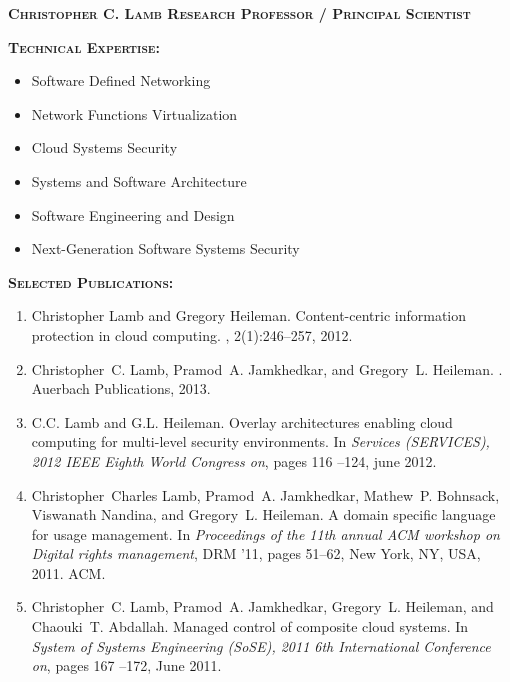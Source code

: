 \documentclass{sbir}
\begin{document}
{{\textbf{\textsc{Christopher C. Lamb \hfill Research Professor / Principal Scientist}}

\vspace{-18pt}
{\textcolor{black}{\makebox[6.5in]{\hrulefill}}
\textbf{\textsc{Technical Expertise:}}
\vspace{-8pt}
\begin{multicols}{2}
\begin{itemize}
 \item Software Defined Networking
 \item Network Functions Virtualization
 \item Cloud Systems Security
 \item Systems and Software Architecture
 \item Software Engineering and Design
 \item Next-Generation Software Systems Security	
\end{itemize}
\end{multicols}

\vspace{-16pt}
\textbf{\textsc{Selected Publications:}}
\begin{enumerate}
\item Christopher Lamb and Gregory Heileman.
\newblock Content-centric information protection in cloud computing.
, 2(1):246--257, 2012.

\item Christopher~C. Lamb, Pramod~A. Jamkhedkar, and Gregory~L. Heileman.
.
\newblock Auerbach Publications, 2013.

\item C.C. Lamb and G.L. Heileman.
\newblock Overlay architectures enabling cloud computing for multi-level security environments.
\newblock In {\em Services (SERVICES), 2012 IEEE Eighth World Congress on}, pages 116 --124, june 2012.

\item Christopher~Charles Lamb, Pramod~A. Jamkhedkar, Mathew~P. Bohnsack, Viswanath Nandina, and Gregory~L. Heileman.
\newblock A domain specific language for usage management.
\newblock In {\em Proceedings of the 11th annual ACM workshop on Digital rights management}, DRM '11, pages 51--62, New York, NY, USA, 2011. ACM.

\item Christopher~C. Lamb, Pramod~A. Jamkhedkar, Gregory~L. Heileman, and Chaouki~T. Abdallah.
\newblock Managed control of composite cloud systems.
\newblock In {\em System of Systems Engineering (SoSE), 2011 6th International Conference on}, pages 167 --172, June 2011.


\end{enumerate}}}}
\end{document}
